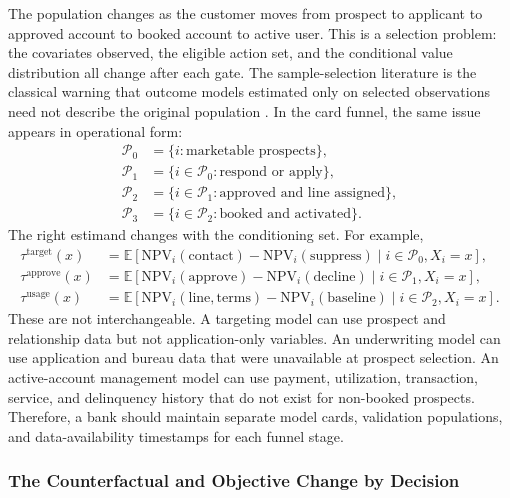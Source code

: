 \documentclass[11pt]{article}
\newcommand{\E}{\mathbb{E}}
\newcommand{\NPV}{\mathrm{NPV}}
\newcommand{\1}{\mathbf{1}}
\begin{document}
The population changes as the customer moves from prospect to applicant to
approved account to booked account to active user. This is a selection problem:
the covariates observed, the eligible action set, and the conditional value
distribution all change after each gate. The sample-selection literature is the
classical warning that outcome models estimated only on selected observations
need not describe the original population \citep{heckman1979selection}. In the
card funnel, the same issue appears in operational form:
\begin{align}
  \mathcal{P}_0 &= \{i:\text{marketable prospects}\},\\
  \mathcal{P}_1 &= \{i\in\mathcal{P}_0:\text{respond or apply}\},\\
  \mathcal{P}_2 &= \{i\in\mathcal{P}_1:\text{approved and line assigned}\},\\
  \mathcal{P}_3 &= \{i\in\mathcal{P}_2:\text{booked and activated}\}.
  \label{eq:funnel-populations}
\end{align}
The right estimand changes with the conditioning set. For example,
\begin{align}
  \tau^{\mathrm{target}}(x)
    &= \E[\NPV_i(\mathrm{contact})-\NPV_i(\mathrm{suppress})
        \mid i\in\mathcal{P}_0,X_i=x],\\
  \tau^{\mathrm{approve}}(x)
    &= \E[\NPV_i(\mathrm{approve})-\NPV_i(\mathrm{decline})
        \mid i\in\mathcal{P}_1,X_i=x],\\
  \tau^{\mathrm{usage}}(x)
    &= \E[\NPV_i(\mathrm{line},\mathrm{terms})-\NPV_i(\mathrm{baseline})
        \mid i\in\mathcal{P}_2,X_i=x].
  \label{eq:funnel-estimands}
\end{align}
These are not interchangeable. A targeting model can use prospect and
relationship data but not application-only variables. An underwriting model can
use application and bureau data that were unavailable at prospect selection.
An active-account management model can use payment, utilization, transaction,
service, and delinquency history that do not exist for non-booked prospects.
Therefore, a bank should maintain separate model cards, validation populations,
and data-availability timestamps for each funnel stage.

\subsubsection{The Counterfactual and Objective Change by Decision}
\label{subsec:decision-counterfactuals}
\end{document}
